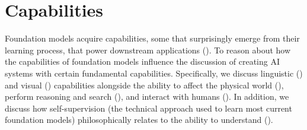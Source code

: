 \section{Capabilities}
\label{sec:capabilities}

Foundation models acquire capabilities, some that surprisingly emerge from their learning process, that power downstream applications ().
To reason about how the capabilities of foundation models influence the discussion of creating AI systems with certain fundamental capabilities.
Specifically, we discuss linguistic () and visual () capabilities alongside the ability to affect the physical world (), perform reasoning and search (), and interact with humans (). 
In addition, we discuss how self-supervision (the technical approach used to learn most current foundation models) philosophically relates to the ability to understand (). 
 










